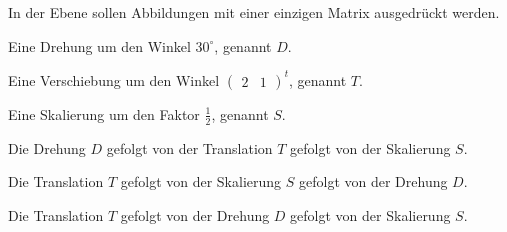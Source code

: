 In der Ebene sollen Abbildungen mit einer einzigen Matrix ausgedrückt werden.
\begin{teilaufgaben}
\item
Eine Drehung um den Winkel $30^\circ$, genannt $D$.
\item
Eine Verschiebung um den Winkel $\begin{pmatrix}2&1\end{pmatrix}^t$,
genannt $T$.
\item
Eine Skalierung um den Faktor $\frac12$, genannt $S$.
\item
Die Drehung $D$ gefolgt von der Translation $T$ gefolgt von der Skalierung $S$.
\item
Die Translation $T$ gefolgt von der Skalierung $S$ gefolgt von der Drehung $D$.
\item
Die Translation $T$ gefolgt von der Drehung $D$ gefolgt von der Skalierung $S$.
\end{teilaufgaben}


